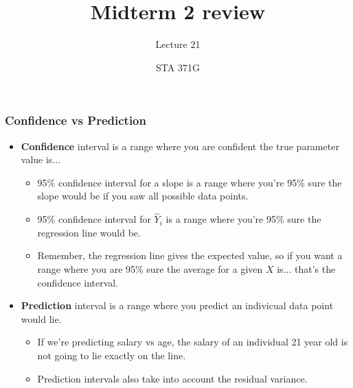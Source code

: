 \documentclass{beamer}\usepackage[]{graphicx}\usepackage[]{color}
\title{Midterm 2 review}
\subtitle{Lecture 21}
\author{STA 371G}
\begin{document}
  
  

  \frame{\maketitle}



  \begin{darkframes}
    \begin{frame}
      \frametitle{Confidence vs Prediction}
      \begin{itemize}
      \item \textbf{Confidence} interval is a range where you are confident the true parameter value is...
        \begin{itemize}
        \item 95\% confidence interval for a slope is a range where you're 95\% sure the slope would be if you saw all possible data points.
        \item 95\% confidence interval for $\hat{Y}_i$ is a range where you're 95\% sure the regression line would be.
        \item Remember, the regression line gives the expected value, so if you want a range where you are 95\% sure the average for a given $X$ is... that's the confidence interval.
        \end{itemize}
      \item \textbf{Prediction} interval is a range where you predict an indivicual data point would lie.
        \begin{itemize}
        \item If we're predicting salary vs age, the salary of an individual 21 year old is not going to lie exactly on the line.
        \item Prediction intervals also take into account the residual variance.
        \end{itemize}
      \end{itemize}
    \end{frame}



\end{darkframes}
\end{document}
